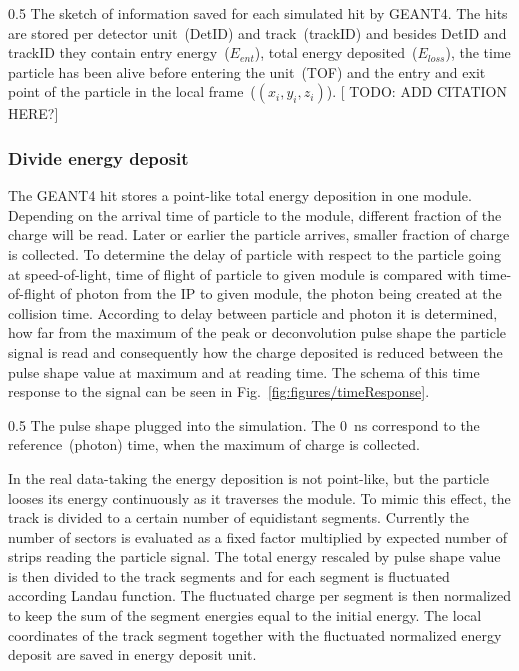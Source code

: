                  {0.5}       %
                 { The sketch of information saved for each simulated hit by GEANT4. The hits are stored per detector unit~(DetID) and track~(trackID) and besides DetID and trackID they contain entry energy~($E_{ent}$), total energy deposited~($E_{loss}$), the time particle has been alive before entering the unit~(TOF) and the entry and exit point of the particle in the local frame~($(x_{i},y_{i},z_{i})$). [ TODO: ADD CITATION HERE?]}

\subsubsection{Divide energy deposit}

The GEANT4 hit stores a point-like total energy deposition in one module. Depending on the arrival time of particle to the module, different fraction of the charge will be read. Later or earlier the particle arrives, smaller fraction of charge is collected. To determine the delay of particle with respect to the particle going at speed-of-light, time of flight of particle to given module is compared with time-of-flight of photon from the IP to given module, the photon being created at the collision time. According to delay between particle and photon it is determined, how far from the maximum of the peak or deconvolution pulse shape the particle signal is read and consequently how the charge deposited is reduced between the pulse shape value at maximum and at reading time. The schema of this time response to the signal can be seen in Fig.~\ref{fig:figures/timeResponse}.


                 {0.5}       %
                 { The pulse shape plugged into the simulation. The 0~ns correspond to the reference~(photon) time, when the maximum of charge is collected.}

In the real data-taking the energy deposition is not point-like, but the particle looses its energy continuously as it traverses the module. To mimic this effect, the track is divided to a certain number of equidistant segments. Currently the number of sectors is evaluated as a fixed factor multiplied by expected number of strips reading the particle signal. The total energy rescaled by pulse shape value is then divided to the track segments and for each segment is fluctuated according Landau function. The fluctuated charge per segment is then normalized to keep the sum of the segment energies equal to the initial energy. The local coordinates of the track segment together with the fluctuated normalized energy deposit are saved in energy deposit unit.


